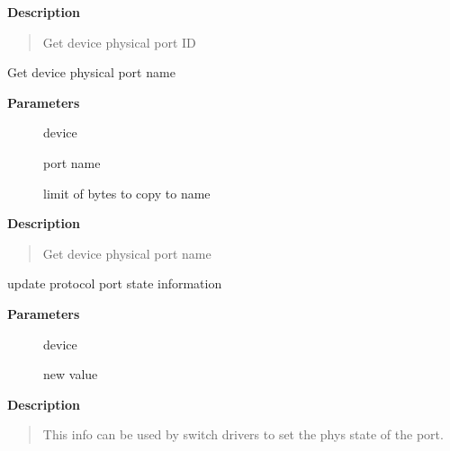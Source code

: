 \documentclass[a4paper,8pt,english]{sphinxmanual}
\begin{document}
\textbf{Description}
\begin{quote}

Get device physical port ID
\end{quote}

\begin{fulllineitems}
\label{networking/kapi:c.dev_get_phys_port_name}
Get device physical port name

\end{fulllineitems}


\textbf{Parameters}
\begin{description}
\item[{}] \leavevmode
device

\item[{}] \leavevmode
port name

\item[{}] \leavevmode
limit of bytes to copy to name

\end{description}

\textbf{Description}
\begin{quote}

Get device physical port name
\end{quote}

\begin{fulllineitems}
\label{networking/kapi:c.dev_change_proto_down}
update protocol port state information

\end{fulllineitems}


\textbf{Parameters}
\begin{description}
\item[{}] \leavevmode
device

\item[{}] \leavevmode
new value

\end{description}

\textbf{Description}
\begin{quote}

This info can be used by switch drivers to set the phys state of the
port.
\end{quote}
\end{document}
